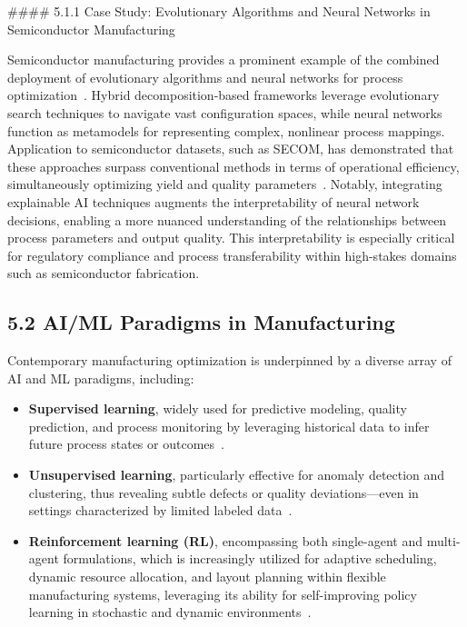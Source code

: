 \documentclass[11pt]{article}
\begin{document}
#### 5.1.1 Case Study: Evolutionary Algorithms and Neural Networks in Semiconductor Manufacturing

Semiconductor manufacturing provides a prominent example of the combined deployment of evolutionary algorithms and neural networks for process optimization~\cite{ref22}. Hybrid decomposition-based frameworks leverage evolutionary search techniques to navigate vast configuration spaces, while neural networks function as metamodels for representing complex, nonlinear process mappings. Application to semiconductor datasets, such as SECOM, has demonstrated that these approaches surpass conventional methods in terms of operational efficiency, simultaneously optimizing yield and quality parameters~\cite{ref22}. Notably, integrating explainable AI techniques augments the interpretability of neural network decisions, enabling a more nuanced understanding of the relationships between process parameters and output quality. This interpretability is especially critical for regulatory compliance and process transferability within high-stakes domains such as semiconductor fabrication.

\subsection{5.2 AI/ML Paradigms in Manufacturing}

Contemporary manufacturing optimization is underpinned by a diverse array of AI and ML paradigms, including:
\begin{itemize}
    \item \textbf{Supervised learning}, widely used for predictive modeling, quality prediction, and process monitoring by leveraging historical data to infer future process states or outcomes~\cite{ref2,ref6,ref13,ref14,ref19,ref20,ref27,ref30,ref37,ref38,ref42,ref44,ref45,ref50,ref52}.
    \item \textbf{Unsupervised learning}, particularly effective for anomaly detection and clustering, thus revealing subtle defects or quality deviations—even in settings characterized by limited labeled data~\cite{ref20,ref27}.
    \item \textbf{Reinforcement learning (RL)}, encompassing both single-agent and multi-agent formulations, which is increasingly utilized for adaptive scheduling, dynamic resource allocation, and layout planning within flexible manufacturing systems, leveraging its ability for self-improving policy learning in stochastic and dynamic environments~\cite{ref6,ref13,ref14,ref19,ref30,ref38,ref44,ref56}.
\end{itemize}
\end{document}
